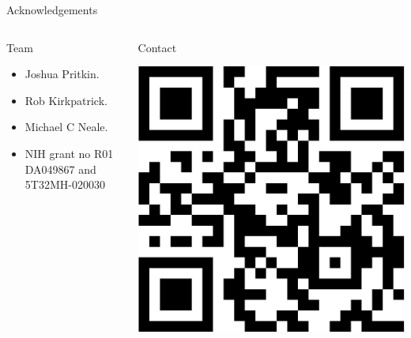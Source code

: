 \documentclass[australian,ignorenonframetext,aspectratio=169]{beamer}
\providecommand{\tightlist}{%
  \setlength{\itemsep}{0pt}\setlength{\parskip}{0pt}}
\begin{document}
\begin{frame}{Acknowledgements}
\protect\hypertarget{acknowledgements}{}

\begin{columns}[T]
\begin{column}{0.5\textwidth}
\begin{block}{Team}

\begin{itemize}
\tightlist
\item
  Joshua Pritkin.
\item
  Rob Kirkpatrick.
\end{itemize}

\vspace{3mm}

\begin{itemize}
\item
  Michael C Neale.
\item
  NIH grant no R01 DA049867 and 5T32MH-020030
\end{itemize}

\end{block}
\end{column}

\begin{column}{0.5\textwidth}
\begin{block}{Contact}

\begin{center}\includegraphics[width=0.8\linewidth]{../graphs/qr-twitter-1} \end{center}

\end{block}
\end{column}
\end{columns}

\appendix

\end{frame}
\end{document}
